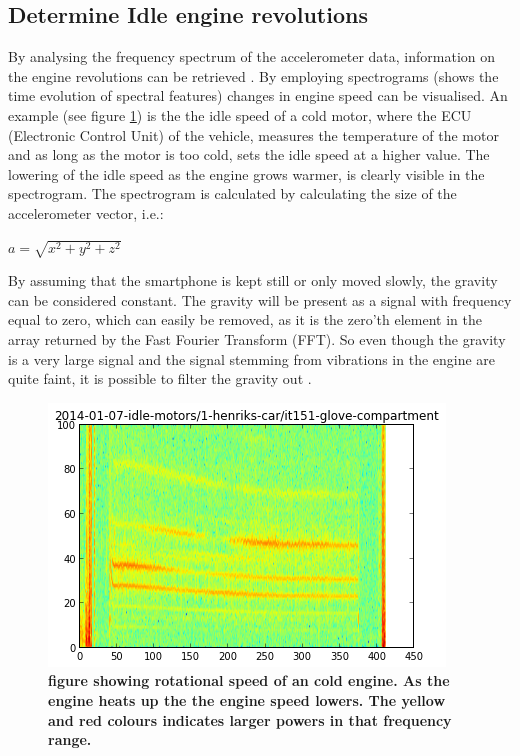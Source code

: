 \subsection{Determine Idle engine revolutions}
By analysing the frequency spectrum of the accelerometer data, information on the engine revolutions can be retrieved \cite{markus2014}. By employing spectrograms (shows the time evolution of spectral features)  changes in engine speed can be visualised. An example (see figure  \ref{idle_henrik}) is the the idle speed of a cold motor, where the ECU (Electronic Control Unit) of the vehicle, measures the temperature of the motor and as long as the motor is too cold, sets the idle speed at a higher value. The lowering of the idle speed as the engine grows warmer, is clearly visible in the spectrogram.
The spectrogram is calculated by calculating the size of the accelerometer vector, i.e.:

\begin{center}
$a = \sqrt{x^2+y^2+z^2}$
\end{center}

By assuming that the smartphone is kept still or only moved slowly, the gravity can be considered constant. The gravity will be present as a signal with frequency equal to zero, which can easily be removed, as it is the zero'th element in the array returned by the Fast Fourier Transform (FFT). So even though the gravity is a very large signal and the signal stemming from vibrations in the engine are quite faint, it is possible to filter the gravity out \cite{Hemminki2013}.

\begin{figure}[!ht]
\begin{center}
\includegraphics{idle_henrik.png}
\caption{{\bf figure showing rotational speed of an cold engine. As the engine heats up the the engine speed lowers. The yellow and red colours indicates larger powers in that frequency range.}}
\label{idle_henrik}
\end{center}
\end{figure}

